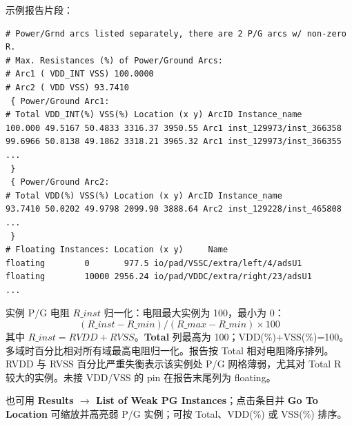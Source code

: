 示例报告片段：
\begin{lstlisting}
# Power/Grnd arcs listed separately, there are 2 P/G arcs w/ non-zero R.
# Max. Resistances (%) of Power/Ground Arcs:
# Arc1 ( VDD_INT VSS) 100.0000
# Arc2 ( VDD VSS) 93.7410
 { Power/Ground Arc1:
# Total VDD_INT(%) VSS(%) Location (x y) ArcID Instance_name
100.000 49.5167 50.4833 3316.37 3950.55 Arc1 inst_129973/inst_366358
99.6966 50.8138 49.1862 3318.21 3965.32 Arc1 inst_129973/inst_366355
...
 }
 { Power/Ground Arc2:
# Total VDD(%) VSS(%) Location (x y) ArcID Instance_name
93.7410 50.0202 49.9798 2099.90 3888.64 Arc2 inst_129228/inst_465808
...
 }
# Floating Instances: Location (x y)     Name
floating        0       977.5 io/pad/VSSC/extra/left/4/adsU1
floating        10000 2956.24 io/pad/VDDC/extra/right/23/adsU1
...
\end{lstlisting}

\label{fig:pg-weak}

实例 P/G 电阻 $R\_{inst}$ 归一化：电阻最大实例为 100，最小为 0：
\[
(R\_{inst}-R\_{min})/(R\_{max}-R\_{min})\times 100
\]
其中 $R\_{inst}=RVDD+RVSS$。\textbf{Total} 列最高为 100；VDD(\%)+VSS(\%)=100。多域时百分比相对所有域最高电阻归一化。报告按 Total 相对电阻降序排列。RVDD 与 RVSS 百分比严重失衡表示该实例处 P/G 网格薄弱，尤其对 Total R 较大的实例。未接 VDD/VSS 的 pin 在报告末尾列为 floating。

也可用 \textbf{Results $\rightarrow$ List of Weak PG Instances}；点击条目并 \textbf{Go To Location} 可缩放并高亮弱 P/G 实例；可按 Total、VDD(\%) 或 VSS(\%) 排序。

